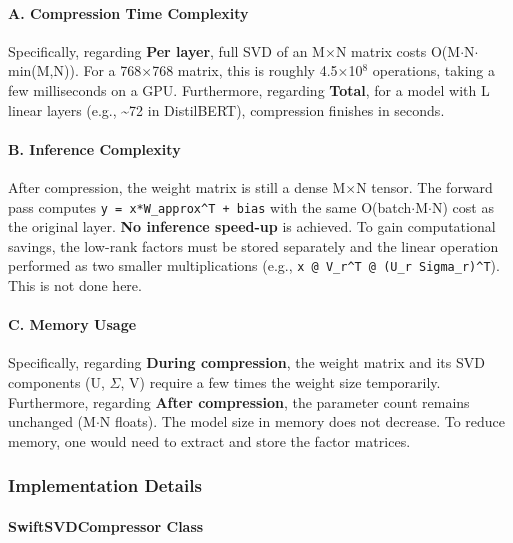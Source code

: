 \paragraph{A. Compression Time Complexity}

Specifically, regarding \textbf{Per layer}, full SVD of an M$\times$N matrix costs O(M$\cdot$N$\cdot$min(M,N)). For a 768$\times$768 matrix, this is roughly 4.5$\times$10$^8$ operations, taking a few milliseconds on a GPU. Furthermore, regarding \textbf{Total}, for a model with L linear layers (e.g., \textasciitilde{}72 in DistilBERT), compression finishes in seconds.


\paragraph{B. Inference Complexity}

After compression, the weight matrix is still a dense M$\times$N tensor. The forward pass computes \texttt{y = x*W\_approx\textasciicircum{}T + bias} with the same O(batch$\cdot$M$\cdot$N) cost as the original layer. \textbf{No inference speed-up} is achieved. To gain computational savings, the low-rank factors must be stored separately and the linear operation performed as two smaller multiplications (e.g., \texttt{x @ V\_r\textasciicircum{}T @ (U\_r Sigma\_r)\textasciicircum{}T}). This is not done here.

\paragraph{C. Memory Usage}

Specifically, regarding \textbf{During compression}, the weight matrix and its SVD components (U, $\Sigma$, V) require a few times the weight size temporarily. Furthermore, regarding \textbf{After compression}, the parameter count remains unchanged (M$\cdot$N floats). The model size in memory does not decrease. To reduce memory, one would need to extract and store the factor matrices.



\subsubsection*{Implementation Details}

\paragraph{SwiftSVDCompressor Class}

